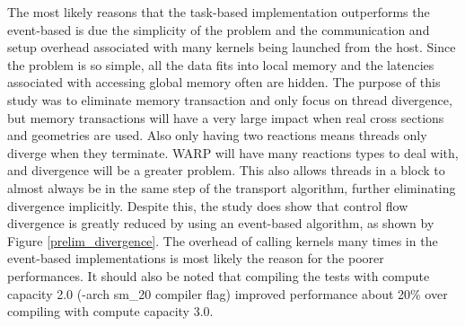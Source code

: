 The most likely reasons that the task-based implementation outperforms the event-based is due the simplicity of the problem and the communication and setup overhead associated with many kernels being launched from the host.  Since the problem is so simple, all the data fits into local memory and the latencies associated with accessing global memory often are hidden.  The purpose of this study was to eliminate memory transaction and only focus on thread divergence, but memory transactions will have a very large impact when real cross sections and geometries are used.  Also only having two reactions means threads only diverge when they terminate.  WARP will have many reactions types to deal with, and divergence will be a greater problem.  This also allows threads in a block to almost always be in the same step of the transport algorithm, further eliminating divergence implicitly.  Despite this, the study does show that control flow divergence is greatly reduced by using an event-based algorithm, as shown by Figure \ref{prelim_divergence}.  The overhead of calling kernels many times in the event-based implementations is most likely the reason for the poorer performances.  It should also be noted that compiling the tests with compute capacity 2.0 (-arch sm\_20 compiler flag) improved performance about 20\% over compiling with compute capacity 3.0.